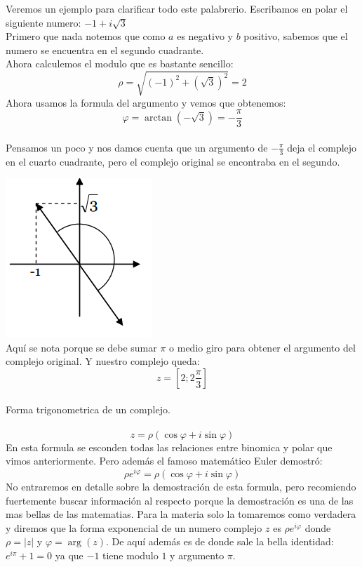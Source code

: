 \documentclass[]{article}
\begin{document}
Veremos un ejemplo para clarificar todo este palabrerio. Escribamos en polar el siguiente numero: $-1 + i \sqrt{3}$
\\
Primero que nada notemos que como $a$ es negativo y $b$ positivo, sabemos que el numero se encuentra en el segundo cuadrante.
\\
Ahora calculemos el modulo que es bastante sencillo:
$$
\rho =  \sqrt{(-1)^{2} + (\sqrt{3})^{2}} = 2
$$
Ahora usamos la formula del argumento y vemos que obtenemos:
$$
\varphi = \arctan(-\sqrt{3}) = -\frac{\pi}{3}
$$
\\
Pensamos un poco y nos damos cuenta que un argumento de $-\frac{\pi}{3}$ deja el complejo en el cuarto cuadrante, pero el complejo original se encontraba en el segundo.

\includegraphics{../../../Imagenes/Superior/Complejos/Complejos03.PNG}
\\
Aquí se nota porque se debe sumar $\pi$ o medio giro para obtener el argumento del complejo original. Y nuestro complejo queda:
$$
z = [2 ; 2\frac{\pi}{3}]
$$
\\
\huge Forma trigonometrica de un complejo.
\normalsize
\\
\\
$$
z = \rho (\cos\varphi + i \sin\varphi)
$$
En esta formula se esconden todas las relaciones entre binomica y polar que vimos anteriormente. Pero además el famoso matemático Euler demostró:
$$
\rho e^{i\varphi} = \rho (\cos\varphi + i \sin\varphi)
$$
No entraremos en detalle sobre la demostración de esta formula, pero recomiendo fuertemente buscar información al respecto porque la demostración es una de las mas bellas de las matematias. Para la materia solo la tomaremos como verdadera y diremos que la forma exponencial de un numero complejo $z$ es $\rho e^{i\varphi}$ donde $\rho = |z|$ y $\varphi = \arg(z)$. De aquí además es de donde sale la bella identidad: $e^{i\pi} + 1 = 0 $ ya que $-1$ tiene modulo $1$ y argumento $\pi$.
\\
\end{document}
